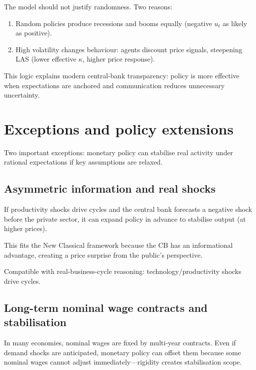 \documentclass[
  letterpaper,
  DIV=11,
  numbers=noendperiod]{scrartcl}
\providecommand{\tightlist}{%
  \setlength{\itemsep}{0pt}\setlength{\parskip}{0pt}}
\begin{document}
The model should not justify randomness. Two reasons:

\begin{enumerate}
\def\labelenumi{\arabic{enumi}.}
\tightlist
\item
  Random policies produce recessions and booms equally (negative \(u_t\)
  as likely as positive).
\item
  High volatility changes behaviour: agents discount price signals,
  steepening LAS (lower effective \(\kappa\), higher price response).
\end{enumerate}

This logic explains modern central-bank transparency: policy is more
effective when expectations are anchored and communication reduces
unnecessary uncertainty.

\section{Exceptions and policy
extensions}\label{exceptions-and-policy-extensions-1}

Two important exceptions: monetary policy can stabilise real activity
under rational expectations if key assumptions are relaxed.

\subsection{Asymmetric information and real
shocks}\label{asymmetric-information-and-real-shocks-1}

If productivity shocks drive cycles and the central bank forecasts a
negative shock before the private sector, it can expand policy in
advance to stabilise output (at higher prices).

This fits the New Classical framework because the CB has an
informational advantage, creating a price surprise from the public's
perspective.

Compatible with real-business-cycle reasoning: technology/productivity
shocks drive cycles.

\subsection{Long-term nominal wage contracts and
stabilisation}\label{long-term-nominal-wage-contracts-and-stabilisation-1}

In many economies, nominal wages are fixed by multi-year contracts. Even
if demand shocks are anticipated, monetary policy can offset them
because some nominal wages cannot adjust immediately---rigidity creates
stabilisation scope.
\end{document}
